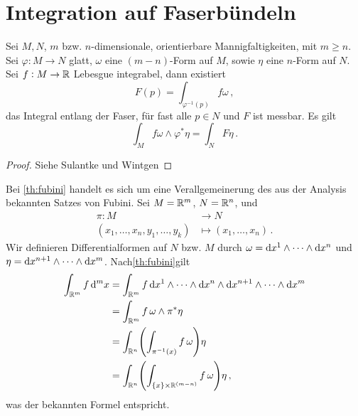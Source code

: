 \section[Integration inv Fkt]{Integration auf Faserbündeln}
\begin{theorem}\label{th:fubini}
Sei $M,N$, $m$ bzw. $n$-dimensionale, orientierbare Mannigfaltigkeiten, mit
$m\geq n$.
Sei $\varphi:M\to N$ glatt, $\omega$ eine $(m-n)$-Form auf $M$, sowie $\eta$
eine $n$-Form auf $N$. Sei $f:M\to \mathbb{R}$ Lebesgue integrabel, dann existiert
\begin{equation}
F(p)=\int_{\varphi^{-1}(p)}f\omega\,,
\end{equation}
das Integral entlang der Faser, für fast alle $p\in N$ und $F$ ist messbar. Es
gilt
\begin{equation}
\int_{M}f\omega\wedge\varphi^*\eta=\int_{N}F \eta\,.
\end{equation}
\end{theorem}
\begin{proof}
Siehe Sulantke und Wintgen
\end{proof}
\begin{bemerkung}
Bei \autoref{th:fubini} handelt es sich um eine Verallgemeinerung des aus der
Analysis bekannten Satzes von Fubini. 
Sei $M=\mathbb{R}^m$, $N=\mathbb{R}^n$, und 
\begin{align*}
  \pi :M &\to N\\
  (x_1,\dots,x_n,y_1,\dots,y_k) &\mapsto (x_1,\dots,x_n)\,.
\end{align*}
Wir definieren Differentialformen auf $N$ bzw. $M$ durch 
$\omega=\dif{x}^1\wedge\cdots\wedge\dif{x}^n$ und
$\eta=\dif{x}^{n+1}\wedge\cdots\wedge\dif{x}^m$.
Nach\autoref{th:fubini}gilt
\begin{equation}
\begin{split}
\int_{\Reals^m} f\dif{}^m x &= \int_{\Reals^m}
f\dif{x}^1\wedge\cdots\wedge\dif{x}^n\wedge\dif{x}^{n+1}\wedge\cdots\wedge\dif{x}^m\\
&= \int_{\Reals^m}f\,\omega\wedge\pi^*\eta\\
&= \int_{\Reals^n}\left(\int_{\pi^{-1}(x)}f\,\omega\right)\eta\\
&= \int_{\Reals^n}\left(\int_{\{x\}\times\Reals^{(m-n)}}f\,\omega\right)\eta\,,
\end{split}
\end{equation}
was der bekannten Formel entspricht.
\end{bemerkung}
